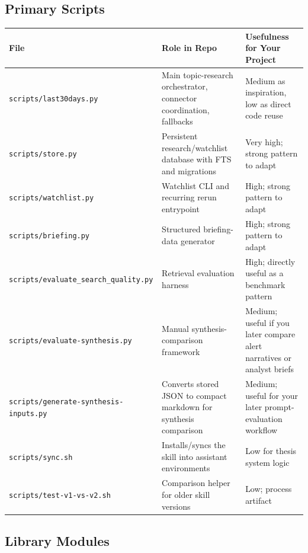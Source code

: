 \documentclass[11pt, letterpaper]{article}
\begin{document}
\subsection{Primary Scripts}

\begin{longtable}{p{4.0cm}p{4.9cm}p{4.7cm}}
\toprule
\textbf{File} & \textbf{Role in Repo} & \textbf{Usefulness for Your Project} \\
\midrule
\endhead
\texttt{scripts/last30days.py} & Main topic-research orchestrator, connector coordination, fallbacks & Medium as inspiration, low as direct code reuse \\
\texttt{scripts/store.py} & Persistent research/watchlist database with FTS and migrations & Very high; strong pattern to adapt \\
\texttt{scripts/watchlist.py} & Watchlist CLI and recurring rerun entrypoint & High; strong pattern to adapt \\
\texttt{scripts/briefing.py} & Structured briefing-data generator & High; strong pattern to adapt \\
\texttt{scripts/evaluate\_search\_quality.py} & Retrieval evaluation harness & High; directly useful as a benchmark pattern \\
\texttt{scripts/evaluate-synthesis.py} & Manual synthesis-comparison framework & Medium; useful if you later compare alert narratives or analyst briefs \\
\texttt{scripts/generate-synthesis-inputs.py} & Converts stored JSON to compact markdown for synthesis comparison & Medium; useful for your later prompt-evaluation workflow \\
\texttt{scripts/sync.sh} & Installs/syncs the skill into assistant environments & Low for thesis system logic \\
\texttt{scripts/test-v1-vs-v2.sh} & Comparison helper for older skill versions & Low; process artifact \\
\bottomrule
\end{longtable}

\subsection{Library Modules}
\end{document}
